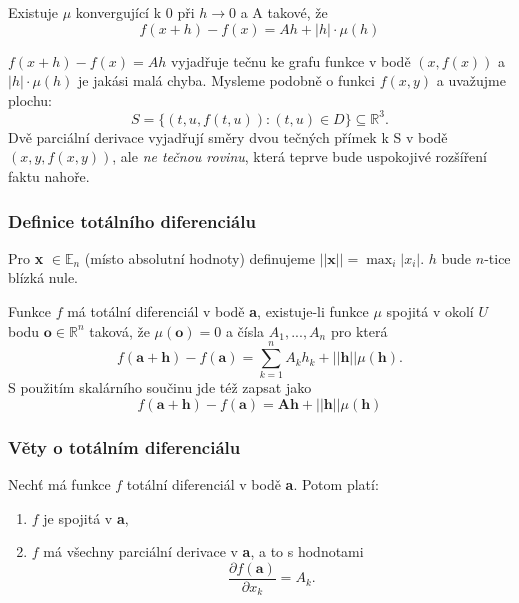 \documentclass[../main.tex]{subfiles}
\begin{document}
\begin{lemma}[Derivace]
	Existuje $\mu$ konvergující k 0 při $h \rightarrow 0$ a A takové, že 
	\[f(x+h) - f(x) = Ah + |h| \cdot \mu(h)\]
\end{lemma}

\begin{intuition}
	$f(x+h) - f(x) = Ah$ vyjadřuje tečnu ke grafu funkce v bodě $(x,f(x))$ a $|h|\cdot \mu(h)$ je jakási malá chyba.
	Mysleme podobně o funkci $f(x,y)$ a uvažujme plochu:
	\[S = \{(t,u,f(t,u)) : (t,u) \in D\} \subseteq \mathbb{R}^3.\]
	Dvě parciální derivace vyjadřují směry dvou tečných přímek k S v bodě $(x,y,f(x,y))$, ale \textit{ne tečnou rovinu},
	která teprve bude uspokojivé rozšíření faktu nahoře.
\end{intuition}

\subsubsection{Definice totálního diferenciálu}
Pro \textbf{x} $\in \mathbb{E}_n$ (místo absolutní hodnoty) definujeme \(||\textbf{x}||  = \max_i|x_i|\). $h$ bude $n$-tice blízká nule.

\begin{definition}
	Funkce $f$ má totální diferenciál v bodě \textbf{a}, existuje-li funkce $\mu$ spojitá v okolí $U$ bodu $\textbf{o} \in \mathbb{R}^n$ taková, že $\mu(\textbf{o}) = 0$
	a čísla $A_1,...,A_n$ pro která
	\[f(\textbf{a}+\textbf{h}) - f(\textbf{a}) = \sum^n_{k=1}A_kh_k+||\textbf{h}||\mu(\textbf{h}).\]
	S použitím skalárního součinu jde též zapsat jako
	$$f(\textbf{a} + \textbf{h}) - f(\textbf{a}) = \textbf{Ah} + ||\textbf{h}|| \mu (\textbf{h})$$
\end{definition}

\subsubsection{Věty o totálním diferenciálu}

\begin{lemma}
	Nechť má funkce $f$ totální diferenciál v bodě \textbf{a}. Potom platí:
	\begin{enumerate}
	    \item $f$ je spojitá v \textbf{a},
	    \item $f$ má všechny parciální derivace v \textbf{a}, a to s hodnotami 
	    \[\frac{\partial f(\textbf{a})}{\partial x_k} = A_k.\]
	\end{enumerate}
\end{lemma}
\end{document}
